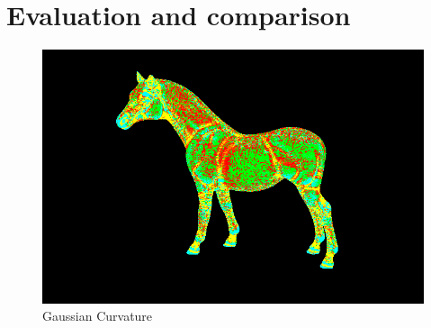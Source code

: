 \documentclass[11pt]{article}
\begin{document}
\section{Evaluation and comparison}
\begin{figure}[!htb]
    \includegraphics[width=\linewidth]{gaussian.png}
    \caption{Gaussian Curvature}\label{fig:gaussian-horse}
  \endminipage
  \end{figure}



\end{document}
